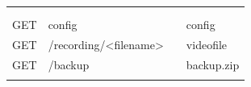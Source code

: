 \begin{table}[]
{\begin{tabular}{llll}
			&                                                                              &                                                                                                                                                                                                                                                        &                            \\
			&                                                                              &                                                                                                                                                                                                                                                        &                            \\
			GET           & config                                                                       &                                                                                                                                                                                                                                                        & config                     \\
			GET           & /recording/\textless{}filename\textgreater{}                                 &                                                                                                                                                                                                                                                        & videofile                  \\
			GET           & /backup                                                                      &                                                                                                                                                                                                                                                        & backup.zip                 \\
			&                                                                              &                                                                                                                                                                                                                                                        &                           
		\end{tabular}}
	\end{table}